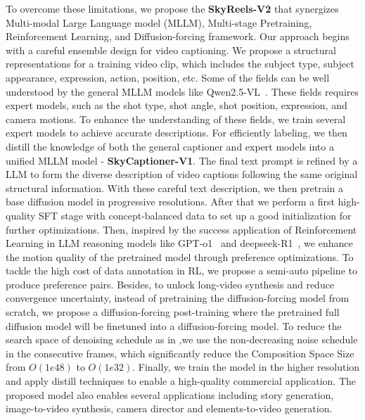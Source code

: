 \documentclass{article}
\begin{document}
To overcome these limitations, we propose the \textbf{SkyReels-V2} that synergizes Multi-modal Large Language model (MLLM), Multi-stage Pretraining, Reinforcement Learning, and Diffusion-forcing framework. Our approach begins with a careful ensemble design for video captioning. We propose a structural representations for a training video clip, which includes the subject type, subject appearance, expression, action, position, etc.  Some of the fields can be well understood by the general MLLM models like Qwen2.5-VL~\cite{Qwen2.5-VL}. These fields requires expert models, such as the shot type, shot angle, shot position, expression, and camera motions. To enhance the understanding of these fields, we train several expert models to achieve accurate descriptions. For efficiently labeling, we then distill the knowledge of both the general captioner and expert models into a unified MLLM model - \textbf{SkyCaptioner-V1}. The final text prompt is refined by a LLM to form the diverse description of video captions following the same original structural information. With these careful text description, we then pretrain a base diffusion model in progressive resolutions. After that we perform a first high-quality SFT stage with concept-balanced data to set up a good initialization for further optimizations. Then, inspired by the success application of Reinforcement Learning in LLM reasoning models like GPT-o1~\cite{gpt-o1} and deepseek-R1~\cite{deepseekR1}, we enhance the motion quality of the pretrained model through preference optimizations. To tackle the high cost of data annotation in RL, we propose a semi-auto pipeline to produce preference pairs. Besides, to unlock long-video synthesis and reduce convergence uncertainty, instead of pretraining the diffusion-forcing model from scratch, we propose a diffusion-forcing post-training where the pretrained full diffusion model will be finetuned into a diffusion-forcing model. To reduce the search space of denoising schedule as in \cite{sun2025ar},we use the non-decreasing noise schedule in the consecutive frames, which significantly reduce the Composition Space Size from $O(1e48)$ to $O(1e32)$. Finally, we train the model in the higher resolution and apply distill techniques to enable a high-quality commercial application. The proposed model also enables several applications including story generation, image-to-video synthesis, camera director and elements-to-video generation.
\end{document}
